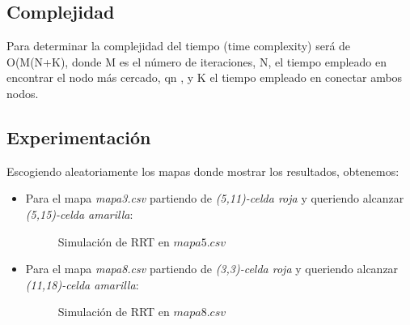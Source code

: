 \documentclass[conference]{IEEEtran}
\begin{document}
{\subsection{Complejidad}

Para determinar la complejidad del tiempo (time complexity) será de O(M(N+K), donde M es el número de iteraciones, N, el tiempo empleado en encontrar el nodo más cercado, qn , y K el tiempo empleado en conectar ambos nodos.

\subsection{Experimentación}
Escogiendo aleatoriamente los mapas donde mostrar los resultados, obtenemos:
\begin{itemize}

\item Para el mapa \textit{mapa3.csv} partiendo de \textit{(5,11)-celda roja} y queriendo alcanzar \textit{(5,15)-celda amarilla}:

\begin{figure}[H]
 \caption{Simulación de RRT en $mapa5.csv$}
 \label{f:animales}
\end{figure}

\item Para el mapa \textit{mapa8.csv} partiendo de \textit{(3,3)-celda roja} y queriendo alcanzar \textit{(11,18)-celda amarilla}:

\begin{figure}[H]
 \caption{Simulación de RRT en $mapa8.csv$}
 \label{f:animales}
\end{figure}


\end{itemize}}
\end{document}
